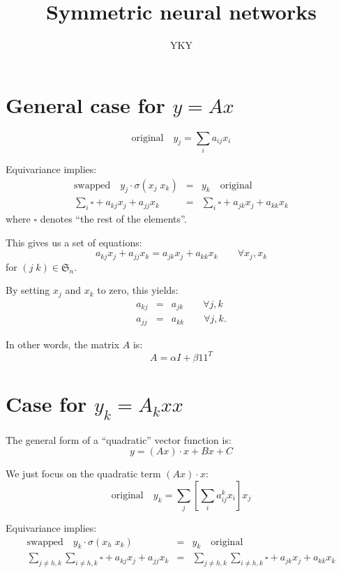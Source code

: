 

\title{Symmetric neural networks}
\author{YKY}


\maketitle

\section{General case for $y = A x$}

\begin{equation}
\boxed{\mbox{original}} \quad y_j = \sum_i a_{ij} x_i
\end{equation}

Equivariance implies:
\begin{eqnarray}
\boxed{\mbox{swapped}} \quad y_j \cdot \sigma(x_j \; x_k) &=& y_k \quad \boxed{\mbox{original}} \nonumber\\
\sum_i \square + a_{kj} x_j + a_{jj} x_k &=& \sum_i \square + a_{jk} x_j + a_{kk} x_k
\end{eqnarray}
where $\square$ denotes ``the rest of the elements''.

This gives us a set of equations:
\begin{equation}
a_{kj} x_j + a_{jj} x_k = a_{jk} x_j + a_{kk} x_k \quad \quad \forall x_j, x_k
\end{equation}
for $(j \; k) \in \mathfrak{S}_n$.

By setting $x_j$ and $x_k$ to zero, this yields:
\begin{eqnarray}
a_{kj} &=& a_{jk} \quad \quad \forall j, k \nonumber \\
a_{jj} &=& a_{kk} \quad \quad \forall j, k .
\end{eqnarray}

In other words, the matrix $A$ is:
\begin{equation}
A = \alpha I + \beta 1 1^T
\end{equation}

\section{Case for $y_k = A_k x x$}

The general form of a ``quadratic'' vector function is:
\begin{equation}
y = (A x) \cdot x + B x + C
\end{equation}

We just focus on the quadratic term $(A x) \cdot x$:
\begin{equation}
\boxed{\mbox{original}} \quad y_k = \sum_j \left[ \sum_i a_{ij}^k x_i \right] x_j
\end{equation}

Equivariance implies:
\begin{eqnarray}
\boxed{\mbox{swapped}} \quad y_k \cdot \sigma(x_h \; x_k) &=& y_k \quad \boxed{\mbox{original}} \nonumber\\
\sum_{j \neq h,k} \sum_{i \neq h,k} \square + a_{kj} x_j + a_{jj} x_k &=& \sum_{j \neq h,k} \sum_{i \neq h,k} \square + a_{jk} x_j + a_{kk} x_k
\end{eqnarray}


